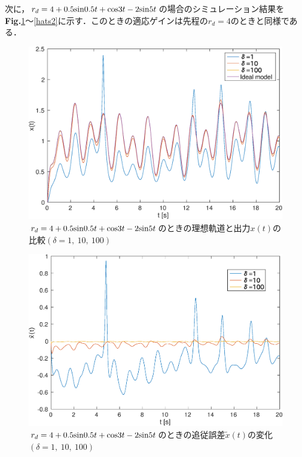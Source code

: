 \documentclass[a4paper,12pt]{jarticle}
\begin{document}
次に，$ r_d = 4 + 0.5{\rm sin}0.5t + {\rm cos}3t -2{\rm sin}5t $の場合のシミュレーション結果を{\bf Fig.}{\ref{x2}}〜{\ref{hats2}}に示す．このときの適応ゲインは先程の$ r_d = 4 $のときと同様である．
\begin{figure}[H]
 \begin{center}
  \includegraphics[scale=0.485]{../figure/eps/input/2/x.eps}
  \caption{$ r_d = 4 + 0.5{\rm sin}0.5t + {\rm cos}3t -2{\rm sin}5t $のときの理想軌道と出力$ x(t) $の比較$(\delta = 1, ~ 10, ~ 100 )$}
  \label{x2}
 \end{center}
\end{figure}
\begin{figure}[H]
 \begin{center}
  \includegraphics[scale=0.5]{../figure/eps/input/2/tilde_x.eps}
  \caption{$ r_d = 4 + 0.5{\rm sin}0.5t + {\rm cos}3t -2{\rm sin}5t $のときの追従誤差$ \tilde{x}(t) $の変化$(\delta = 1, ~ 10, ~ 100 )$}
  \label{tilde_x2}
 \end{center}
\end{figure}
\end{document}
